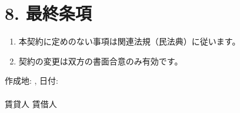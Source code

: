 \section*{8. 最終条項}
\begin{enumerate}[label=\arabic*.]
\item 本契約に定めのない事項は関連法規（民法典）に従います。
\item 契約の変更は双方の書面合意のみ有効です。
\end{enumerate}
\vspace{2cm}
作成地: \ContractPlace, 日付: \ContractDate \hfill \underline{\hspace{5cm}} \\ \vspace{1.5cm}
\underline{\hspace{5cm}} \hfill \underline{\hspace{5cm}} \\ \vspace{0.2cm} 賃貸人 \hfill 賃借人 \\
